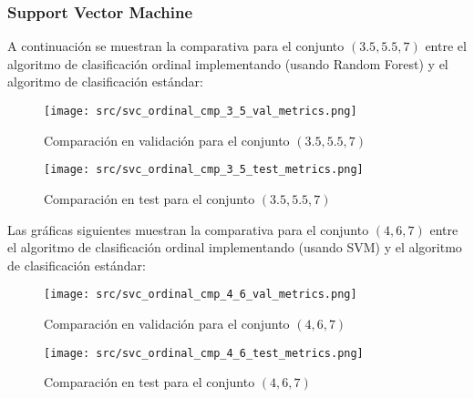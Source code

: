 \subsubsection*{Support Vector Machine}
\label{sec:ord_cmp_svm}
A continuación se muestran la comparativa para el conjunto $(3.5,5.5,7)$ entre el algoritmo de clasificación ordinal implementando  (usando Random Forest)  y el algoritmo de clasificación estándar:
\begin{figure}[H]
	\centering
	\texttt{[image: src/svc\_ordinal\_cmp\_3\_5\_val\_metrics.png]}
	\caption{Comparación en validación para el conjunto  $(3.5,5.5,7)$ }
	\label{fig:svc_ordin_val_cmp_1}
\end{figure}
\begin{figure}[H]
	\centering
	\texttt{[image: src/svc\_ordinal\_cmp\_3\_5\_test\_metrics.png]}
	\caption{Comparación en test para el conjunto  $(3.5,5.5,7)$}
	\label{fig:svc_ordin_test_cmp_1}
\end{figure}
Las gráficas siguientes muestran la comparativa para el conjunto $(4,6,7)$ entre el algoritmo de clasificación ordinal implementando  (usando SVM) y el algoritmo de clasificación estándar:
\begin{figure}[H]
	\centering
	\texttt{[image: src/svc\_ordinal\_cmp\_4\_6\_val\_metrics.png]}
	\caption{Comparación en validación para el conjunto $(4,6,7)$}
	\label{fig:svc_ordin_val_cmp_2}
\end{figure}
\begin{figure}[H]
	\centering
	\texttt{[image: src/svc\_ordinal\_cmp\_4\_6\_test\_metrics.png]}
	\caption{Comparación en test para el conjunto  $(4,6,7)$}
	\label{fig:svc_ordin_test_cmp_2}
\end{figure}
